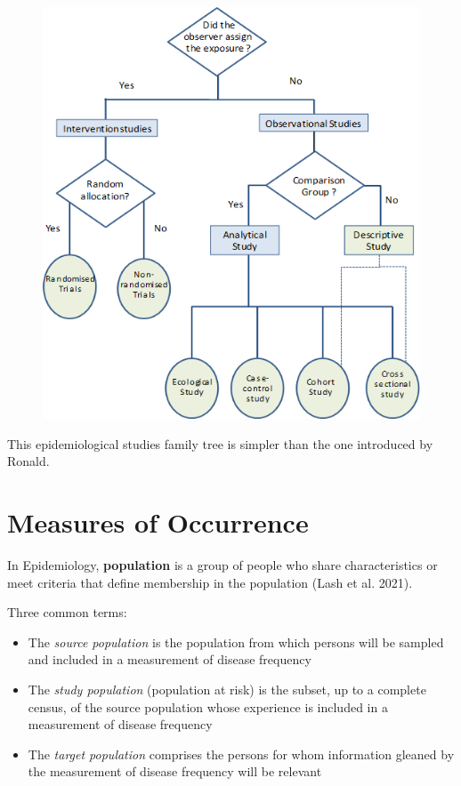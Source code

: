 \documentclass[
  letterpaper,
  DIV=11,
  numbers=noendperiod]{scrreprt}
\begin{document}
\begin{figure}

{\centering \includegraphics{./images/study_types.gif}

}

\end{figure}

This epidemiological studies family tree is simpler than the one
introduced by Ronald.

\hypertarget{measures-of-occurrence}{%
\chapter{Measures of Occurrence}\label{measures-of-occurrence}}

In Epidemiology, \textbf{population} is a group of people who share
characteristics or meet criteria that define membership in the
population (Lash et al. 2021).

Three common terms:

\begin{itemize}
\item
  The \emph{source population} is the population from which persons will
  be sampled and included in a measurement of disease frequency
\item
  The \emph{study population} (population at risk) is the subset, up to
  a complete census, of the source population whose experience is
  included in a measurement of disease frequency
\item
  The \emph{target population} comprises the persons for whom
  information gleaned by the measurement of disease frequency will be
  relevant
\end{itemize}
\end{document}
